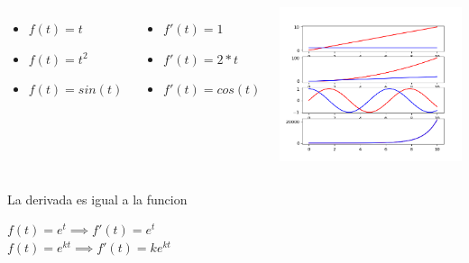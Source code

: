 \begin{frame}{2.7182818284590450907955982984276488423347473144}
   \begin{columns}[onlytextwidth]
      \begin{itemize}
         \item $f(t) =t$
         \item $f(t) =t^2$
         \item $f(t) =sin(t)$
      \end{itemize}
      \begin{itemize}
         \item $f'(t) = 1$
         \item $f'(t) = 2*t$
         \item $f'(t) = cos(t)$
      \end{itemize}
      \includegraphics[width=1.0\textwidth]{3_clase/derivadas}
   \end{columns}
   \begin{block}{La derivada es igual a la funcion}
      \begin{center}
         $f(t) =e^t    \implies f'(t) = e^t$\\
         $f(t) =e^{kt} \implies f'(t) =ke^{kt}$
      \end{center}
   \end{block}
   \vfill
\end{frame}
